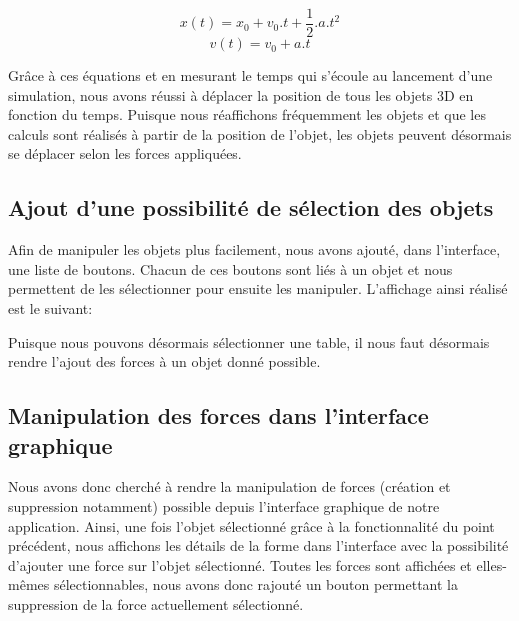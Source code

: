 \documentclass[11pt]{report}
\begin{document}
\[
      x(t) = x_{0} + v_{0} . t + \frac{1}{2}.a.t^{2}
\]
\[
      v(t) = v_{0} + a.t
\]

Grâce à ces équations et en mesurant le temps qui s'écoule au lancement d'une simulation, nous avons réussi à déplacer
la position de tous les objets 3D en fonction du temps. Puisque nous réaffichons fréquemment les objets et que les calculs sont réalisés
à partir de la position de l'objet, les objets peuvent désormais se déplacer selon les forces appliquées.\newline


\subsection{Ajout d'une possibilité de sélection des objets}

Afin de manipuler les objets plus facilement, nous avons ajouté, dans l'interface, une liste de boutons. Chacun de ces boutons
sont liés à un objet et nous permettent de les sélectionner pour ensuite les manipuler. L'affichage ainsi réalisé est le suivant:


Puisque nous pouvons désormais sélectionner une table, il nous faut désormais rendre l'ajout des forces à un objet donné possible.


\subsection{Manipulation des forces dans l'interface graphique}

Nous avons donc cherché à rendre la manipulation de forces (création et suppression notamment) possible depuis l'interface graphique
de notre application. Ainsi, une fois l'objet sélectionné grâce à la fonctionnalité du point précédent, nous affichons les détails
de la forme dans l'interface avec la possibilité d'ajouter une force sur l'objet sélectionné. Toutes les forces sont affichées
et elles-mêmes sélectionnables, nous avons donc rajouté un bouton permettant la suppression de la force actuellement sélectionné.

\end{document}
